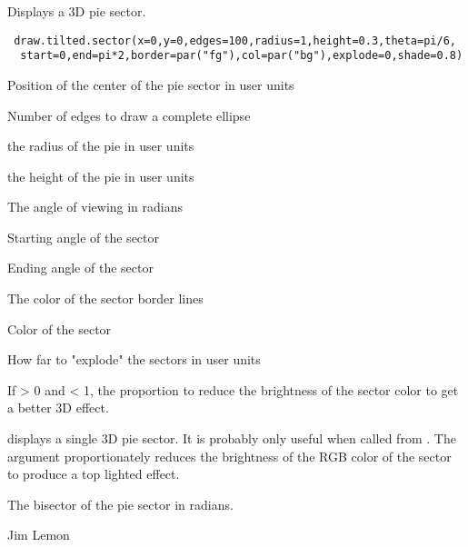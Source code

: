 \begin{Description}\relax
Displays a 3D pie sector.
\end{Description}
\begin{Usage}
\begin{verbatim}
 draw.tilted.sector(x=0,y=0,edges=100,radius=1,height=0.3,theta=pi/6,
  start=0,end=pi*2,border=par("fg"),col=par("bg"),explode=0,shade=0.8)
\end{verbatim}
\end{Usage}
\begin{Arguments}
\begin{ldescription}
\item[\code{x,y}] Position of the center of the pie sector in user units
\item[\code{edges}] Number of edges to draw a complete ellipse
\item[\code{radius}] the radius of the pie in user units
\item[\code{height}] the height of the pie in user units
\item[\code{theta}] The angle of viewing in radians
\item[\code{start}] Starting angle of the sector
\item[\code{end}] Ending angle of the sector
\item[\code{border}] The color of the sector border lines
\item[\code{col}] Color of the sector
\item[\code{explode}] How far to "explode" the sectors in user units
\item[\code{shade}] If \textgreater{} 0 and \textless{} 1, the proportion to reduce the
brightness of the sector color to get a better 3D effect.
\end{ldescription}
\end{Arguments}
\begin{Details}\relax
{} displays a single 3D pie sector. It is probably
only useful when called from . The 
argument proportionately reduces the brightness of the RGB color of
the sector to produce a top lighted effect.
\end{Details}
\begin{Value}
The bisector of the pie sector in radians.
\end{Value}
\begin{Author}\relax
Jim Lemon
\end{Author}
\begin{SeeAlso}\relax
{}
\end{SeeAlso}

